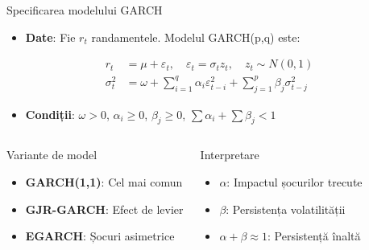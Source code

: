 \documentclass[9pt, aspectratio=169, t]{beamer}
\begin{document}
\begin{frame}{Specificarea modelului GARCH}
    \vspace{-3mm}
    \begin{defn}
        \begin{itemize}\setlength{\itemsep}{0pt}
            \item \textbf{Date}: Fie $r_t$ randamentele. Modelul GARCH(p,q) este:
        \end{itemize}
        \vspace{-0.2cm}
        \begin{align*}
            r_t &= \mu + \varepsilon_t, \quad \varepsilon_t = \sigma_t z_t, \quad z_t \sim N(0,1) \\[0.1cm]
            \sigma_t^2 &= \omega + \sum_{i=1}^{q}\alpha_i \varepsilon_{t-i}^2 + \sum_{j=1}^{p}\beta_j \sigma_{t-j}^2
        \end{align*}
        \vspace{-0.4cm}
        \begin{itemize}\setlength{\itemsep}{0pt}
            \item \textbf{Condiții}: $\omega > 0$, $\alpha_i \geq 0$, $\beta_j \geq 0$, $\sum \alpha_i + \sum \beta_j < 1$
        \end{itemize}
    \end{defn}
    \vspace{-1mm}
    {\footnotesize
    \begin{columns}[T]
        \begin{block}{Variante de model}
            \begin{itemize}\setlength{\itemsep}{0pt}
                \item \textbf{GARCH(1,1)}: Cel mai comun
                \item \textbf{GJR-GARCH}: Efect de levier
                \item \textbf{EGARCH}: Șocuri asimetrice
            \end{itemize}
        \end{block}

        \begin{block}{Interpretare}
            \begin{itemize}\setlength{\itemsep}{0pt}
                \item $\alpha$: Impactul șocurilor trecute
                \item $\beta$: Persistența volatilității
                \item $\alpha + \beta \approx 1$: Persistență înaltă
            \end{itemize}
        \end{block}
    \end{columns}
    }
\end{frame}
\end{document}
